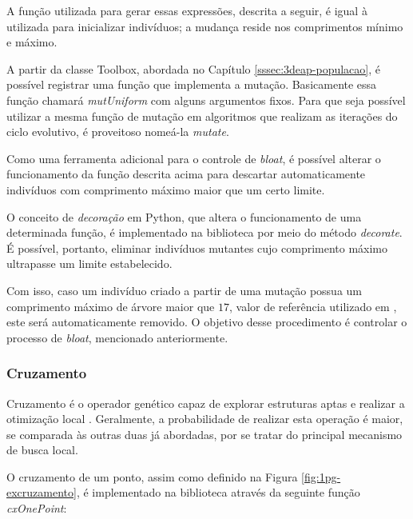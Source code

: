 A função utilizada para gerar essas expressões, descrita a seguir, é igual à utilizada para inicializar indivíduos; a mudança reside nos comprimentos mínimo e máximo.



A partir da classe Toolbox, abordada no Capítulo \ref{sssec:3deap-populacao}, é possível registrar uma função que implementa a mutação. Basicamente essa função chamará \textit{mutUniform} com alguns argumentos fixos. Para que seja possível utilizar a mesma função de mutação em algoritmos que realizam as iterações do ciclo evolutivo, é proveitoso nomeá-la \textit{mutate}.

Como uma ferramenta adicional para o controle de \textit{bloat}, é possível alterar o funcionamento da função descrita acima para descartar automaticamente indivíduos com comprimento máximo maior que um certo limite.

O conceito de \textit{decoração} em Python, que altera o funcionamento de uma determinada função, é implementado na biblioteca por meio do método \textit{decorate}. É possível, portanto, eliminar indivíduos mutantes cujo comprimento máximo ultrapasse um limite estabelecido.

Com isso, caso um indivíduo criado a partir de uma mutação possua um comprimento máximo de árvore maior que $17$, valor de referência utilizado em \cite{koza92bookGp}, este será automaticamente removido. O objetivo desse procedimento é controlar o processo de \textit{bloat}, mencionado anteriormente.

\subsubsection{Cruzamento}\label{sssec:3deap-crossover}

Cruzamento é o operador genético capaz de explorar estruturas aptas e realizar a otimização local \cite{duriez17bookMlc}. Geralmente, a probabilidade de realizar esta operação é maior, se comparada às outras duas já abordadas, por se tratar do principal mecanismo de busca local.

O cruzamento de um ponto, assim como definido na Figura \ref{fig:1pg-excruzamento}, é implementado na biblioteca através da seguinte função \textit{cxOnePoint}:

